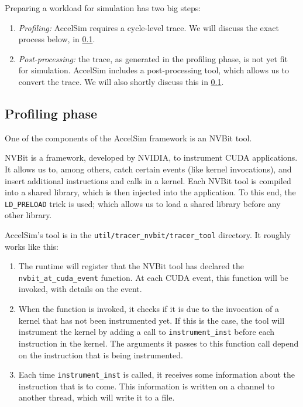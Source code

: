 Preparing a workload for simulation has two big steps:
\begin{enumerate}
    \item \textit{Profiling:} AccelSim requires a cycle-level trace.
    We will discuss the exact process below, in \cref{subsec:profiling-phase}.
    \item \textit{Post-processing:} the trace, as generated in the profiling phase, is not yet fit for simulation.
    AccelSim includes a post-processing tool, which allows us to convert the trace.
    We will also shortly discuss this in \cref{subsec:profiling-phase}.
\end{enumerate}

\subsection{Profiling phase}\label{subsec:profiling-phase}
One of the components of the AccelSim framework is an NVBit\cite{nvbit} tool.

NVBit is a framework, developed by NVIDIA, to instrument CUDA applications.
It allows us to, among others, catch certain events (like kernel invocations), and insert additional instructions and calls in a kernel.
Each NVBit tool is compiled into a shared library, which is then injected into the application.
To this end, the \verb|LD_PRELOAD| trick is used; which allows us to load a shared library before any other library.

AccelSim's tool is in the \verb|util/tracer_nvbit/tracer_tool| directory.
It roughly works like this:
\begin{enumerate}
    \item The runtime will register that the NVBit tool has declared the \verb|nvbit_at_cuda_event| function.
    At each CUDA event, this function will be invoked, with details on the event.
    \item When the function is invoked, it checks if it is due to the invocation of a kernel that has not been instrumented yet.
    If this is the case, the tool will instrument the kernel by adding a call to \verb|instrument_inst| before each instruction in the kernel.
    The arguments it passes to this function call depend on the instruction that is being instrumented.
    \item Each time \verb|instrument_inst| is called, it receives some information about the instruction that is to come.
    This information is written on a channel to another thread, which will write it to a file.
\end{enumerate}

